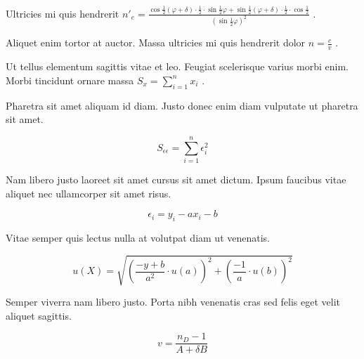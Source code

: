 \documentclass{article}
\begin{document}
Ultricies mi quis hendrerit 
\begin{math}
	n'_e=\frac{\cos \frac{1}{2}(\varphi +\delta)\cdot \frac{1}{2} \cdot \sin \frac{1}{2} \varphi + \sin \frac{1}{2}(\varphi +\delta)\cdot \frac{1}{2} \cdot \cos \frac{1}{2} }{(\sin \frac{1}{2}\varphi)^2}
\end{math}
.\newline

Aliquet enim tortor at auctor. Massa ultricies mi quis hendrerit dolor 
$ n=\frac{c}{v} $
.\newline

Ut tellus elementum sagittis vitae et leo. Feugiat scelerisque varius morbi enim. Morbi tincidunt ornare massa 
\( S_x=\sum_{i=1}^{n}x_i \)
.\newline

Pharetra sit amet aliquam id diam. Justo donec enim diam vulputate ut pharetra sit amet.

\[ S_{\epsilon \epsilon}=\sum_{i=1}^{n}\epsilon_i^2 \]

Nam libero justo laoreet sit amet cursus sit amet dictum. Ipsum faucibus vitae aliquet nec ullamcorper sit amet risus.

$$ \epsilon_i=y_i-ax_i-b $$

Vitae semper quis lectus nulla at volutpat diam ut venenatis.

\begin{displaymath}
	u(X)=\sqrt{(\frac{-y+b}{a^2}\cdot u(a))^2+(\frac{-1}{a}\cdot u(b))^2}
\end{displaymath}

Semper viverra nam libero justo. Porta nibh venenatis cras sed felis eget velit aliquet sagittis.

\begin{equation}
	v=\frac{n_D-1}{A+\delta B}
\end{equation}
\end{document}
